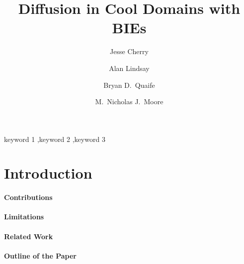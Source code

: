\documentclass[preprint, 10pt]{elsarticle}
\begin{document}
\title{Diffusion in Cool Domains with BIEs}

\author[Bryan1]{Jesse Cherry}
\author[Alan]{Alan Lindsay}
\author[Bryan1,Bryan2]{Bryan D.~Quaife}
\author[Nick]{M.~Nicholas J.~Moore}

\address[Nick]{Department of Mathematics, United States Naval Academy,
Annapolis, MD, 21402.}
\address[Bryan1]{Department of Scientific Computing, Florida State University, Tallahassee, FL, 32306.}
\address[Bryan2]{Geophysical Fluid Dynamics Institute, Florida State
University, Tallahassee, FL, 32306.}
\address[Alan]{Department of Applied \& Computational Math \&
Statistics, University of Notre Dame, South Bend, IN, 46656.}

\begin{abstract} 
\end{abstract}

\begin{keyword}
  keyword 1 \sep keyword 2 \sep keyword 3 
\end{keyword}

\maketitle

\section{Introduction\label{s:intro}}

\cite{chi-moo-qua2020}
\cite{qua-moo2018}


\paragraph{Contributions}


\paragraph{Limitations}

\paragraph{Related Work}

\paragraph{Outline of the Paper}
\end{document}
